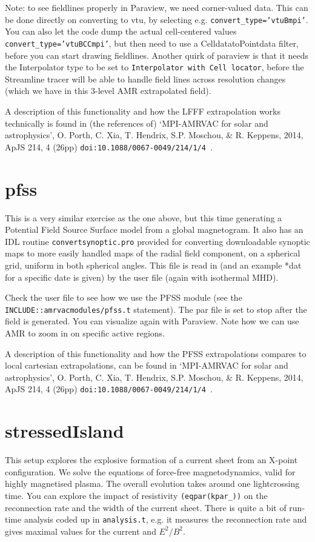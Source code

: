 \documentclass[10pt]{article}
\begin{document}
Note: to see fieldlines properly in Paraview, we need corner-valued data. This can be done directly on converting to vtu, by selecting e.g. {\tt convert\_type='vtuBmpi'}. You can also let the code dump the actual cell-centered values {\tt convert\_type='vtuBCCmpi'}, but then need to use a CelldatatoPointdata filter, before you can start drawing fieldlines. Another quirk of paraview is that it needs the Interpolator type to be set to {\tt Interpolator with Cell locator}, before the Streamline tracer will be able to handle field lines across resolution changes (which we have in this 3-level AMR extrapolated field).

A description of this functionality and how the LFFF extrapolation works technically is found in (the references of)
`MPI-AMRVAC for solar and astrophysics', O. Porth, C. Xia, T. Hendrix, S.P. Moschou, \& R. Keppens, 2014, ApJS 214, 4 (26pp) {\tt doi:10.1088/0067-0049/214/1/4 }.

\section*{pfss}

This is a very similar exercise as the one above, but this time generating a Potential Field Source Surface model from a global magnetogram. It also has an IDL routine {\tt convertsynoptic.pro} provided for converting downloadable synoptic maps to more easily handled maps of the radial field component, on a spherical grid, uniform in both spherical angles. This file is read in (and an example *dat for a specific date is given) by the user file (again with isothermal MHD).

Check the user file to see how we use the PFSS module (see the {\tt INCLUDE::amrvacmodules/pfss.t} statement). The par file is set to stop after the field is generated. You can visualize again with Paraview. Note how we can use AMR to zoom in on specific active regions.

A description of this functionality and how the PFSS extrapolations compares to local cartesian extrapolations, can be found in
`MPI-AMRVAC for solar and astrophysics', O. Porth, C. Xia, T. Hendrix, S.P. Moschou, \& R. Keppens, 2014, ApJS 214, 4 (26pp) {\tt doi:10.1088/0067-0049/214/1/4 }.

\section*{stressedIsland}

This setup explores the explosive formation of a current sheet from an X-point configuration.  We solve the equations of force-free magnetodynamics, valid for highly magnetised plasma.  The overall evolution takes around one lightcrossing time.  
You can explore the impact of resistivity {\tt (eqpar(kpar\_))} on the reconnection rate and the width of the current sheet.  
There is quite a bit of run-time analysis coded up in {\tt analysis.t}, e.g. it measures the reconnection rate and gives maximal values for the current and $E^2/B^2$.  
\end{document}
